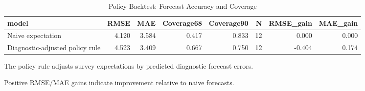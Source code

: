 \begin{table}[!htbp]
\centering
\caption{Policy Backtest: Forecast Accuracy and Coverage}
\label{tab:policy_backtest}
\begin{threeparttable}

\begin{tabular}{lrrrrrrr}
\toprule
model & RMSE & MAE & Coverage68 & Coverage90 & N & RMSE\_gain & MAE\_gain\\
\midrule
Naive expectation & 4.120 & 3.584 & 0.417 & 0.833 & 12 & 0.000 & 0.000\\
Diagnostic-adjusted policy rule & 4.523 & 3.409 & 0.667 & 0.750 & 12 & -0.404 & 0.174\\
\bottomrule
\end{tabular}
\begin{tablenotes}[flushleft]
\footnotesize
\item The policy rule adjusts survey expectations by predicted diagnostic forecast errors.
\item Positive RMSE/MAE gains indicate improvement relative to naive forecasts.
\end{tablenotes}
\end{threeparttable}
\end{table}
